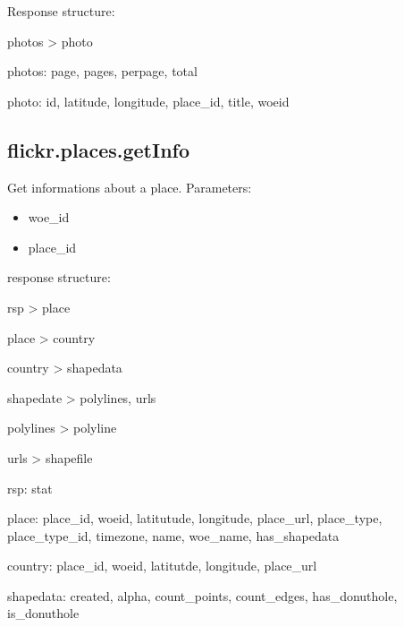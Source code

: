 \documentclass[letterpaper,10pt,english]{sphinxmanual}
\begin{document}
Response structure:

\begin{DUlineblock}{0em}
\item[] photos \textgreater{} photo
\end{DUlineblock}

\begin{DUlineblock}{0em}
\item[] photos: page, pages, perpage, total
\item[] photo: id, latitude, longitude, place\_id, title, woeid
\end{DUlineblock}


\subsection{flickr.places.getInfo}
\label{flickr:flickr-places-getinfo}
Get informations about a place.
Parameters:
\begin{itemize}
\item {} 
woe\_id

\item {} 
place\_id

\end{itemize}

response structure:

\begin{DUlineblock}{0em}
\item[] rsp \textgreater{} place
\item[] place \textgreater{} country
\item[] country \textgreater{} shapedata
\item[] shapedate \textgreater{} polylines, urls
\item[] polylines \textgreater{} polyline
\item[] urls \textgreater{} shapefile
\end{DUlineblock}

\begin{DUlineblock}{0em}
\item[] rsp: stat
\item[] place: place\_id, woeid, latitutude, longitude, place\_url, place\_type, place\_type\_id, timezone, name, woe\_name, has\_shapedata
\item[] country: place\_id, woeid, latitutde, longitude, place\_url
\item[] shapedata: created, alpha, count\_points, count\_edges, has\_donuthole, is\_donuthole
\end{DUlineblock}
\end{document}
